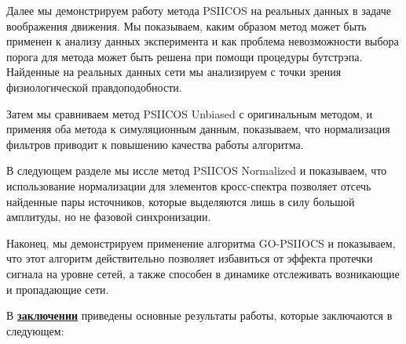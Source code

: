 Далее мы демонстрируем работу метода PSIICOS на реальных данных в
задаче воображения движения. Мы показываем, каким образом метод
может быть применен к анализу данных эксперимента и как проблема невозможности
выбора порога для метода может быть решена при помощи процедуры бутстрэпа.
Найденные на реальных данных сети мы анализируем с точки зрения физиологической
правдоподобности.

Затем мы сравниваем метод PSIICOS Unbiased с оригинальным методом,
и применяя оба метода к симуляционным данным, показываем,
что нормализация фильтров приводит к повышению качества работы алгоритма.

В следующем разделе мы иссле метод PSIICOS Normalized
и показываем, что использование нормализации для элементов кросс-спектра
позволяет отсечь найденные пары источников, которые выделяются лишь в
силу большой амплитуды, но не фазовой синхронизации.

Наконец, мы демонстрируем применение алгоритма GO-PSIIOCS и показываем,
что этот алгоритм действительно позволяет избавиться от эффекта протечки
сигнала на уровне сетей, а также способен в динамике отслеживать
возникающие и пропадающие сети.



В \underline{\textbf{заключении}} приведены основные результаты работы, которые заключаются в следующем:




